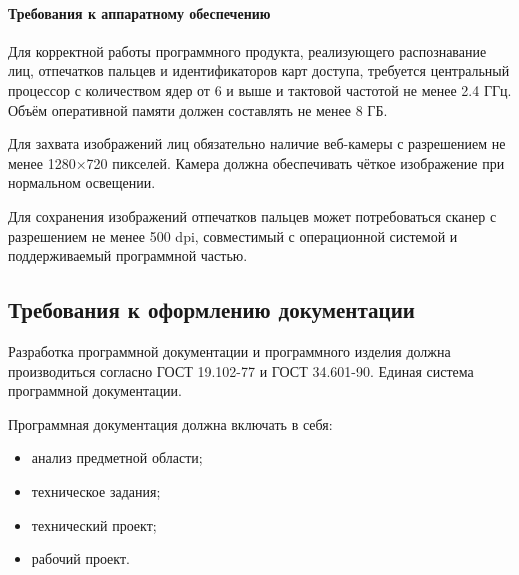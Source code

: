 \paragraph {Требования к аппаратному обеспечению}

Для корректной работы программного продукта, реализующего распознавание лиц, отпечатков пальцев и идентификаторов карт доступа, требуется центральный процессор с количеством ядер от 6 и выше и тактовой частотой не менее 2.4 ГГц. Объём оперативной памяти должен составлять не менее 8 ГБ.

Для захвата изображений лиц обязательно наличие веб-камеры с разрешением не менее 1280×720 пикселей. Камера должна обеспечивать чёткое изображение при нормальном освещении.

Для сохранения изображений отпечатков пальцев может потребоваться сканер с разрешением не менее 500 dpi, совместимый с операционной системой и поддерживаемый программной частью.

\subsection{Требования к оформлению документации}

Разработка программной документации и программного изделия должна производиться согласно ГОСТ 19.102-77 и ГОСТ 34.601-90. Единая система программной документации.

Программная документация должна включать в себя:
\begin{itemize}
	\item анализ предметной области;
	\item техническое задания;
	\item технический проект;
	\item рабочий проект.
\end{itemize}